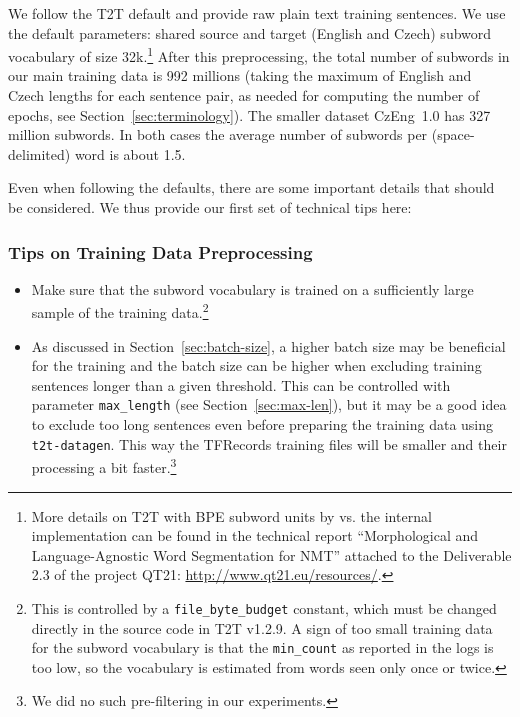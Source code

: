 \documentclass{pbmlarxiv} \pdfoutput=1
\def\Sref#1{Section~\ref{#1}}
\def\perscite#1{\citet{#1}}
\begin{document}
We follow the T2T default and provide raw plain text training sentences.
We use the default parameters: shared source and target (English and Czech) subword vocabulary
 of size 32k.\footnote{
  More details on T2T with BPE subword units by \perscite{sennrich-haddow-birch:2016:P16-12}
   vs. the internal implementation can be found in the technical report
   ``Morphological and Language-Agnostic Word Segmentation for NMT'' attached to the Deliverable 2.3
   of the project QT21: \url{http://www.qt21.eu/resources/}.
 }
After this preprocessing, the total number of subwords in our main training data is 992 millions
 (taking the maximum of English and Czech lengths for each sentence pair,
  as needed for computing the number of epochs, see \Sref{sec:terminology}).
The smaller dataset CzEng~1.0 has 327 million subwords.
In both cases the average number of subwords per (space-delimited) word is about 1.5.
%

Even when following the defaults, there are some important details that should be considered. We thus provide our first set of technical tips here:

\subsubsection*{Tips on Training Data Preprocessing}
\begin{itemize}
\item Make sure that the subword vocabulary is trained on a sufficiently large sample of the training data.\cprotect\footnote{%
  This is controlled by a \verb|file_byte_budget| constant,
   which must be changed directly in the source code in T2T v1.2.9.
  A sign of too small training data for the subword vocabulary is
   that the \verb|min_count| as reported in the logs is too low,
   so the vocabulary is estimated from words seen only once or twice.
 }
\item As discussed in Section~\ref{sec:batch-size}, a higher batch size may be beneficial for the training
  and the batch size can be higher when excluding training sentences longer than a given threshold.
 This can be controlled with parameter \verb|max_length| (see \Sref{sec:max-len}),
  but it may be a good idea to exclude too long sentences
  even before preparing the training data using \verb|t2t-datagen|.
 This way the TFRecords training files will be smaller and their processing a bit faster.\footnote{
  We did no such pre-filtering in our experiments.
 }
\end{itemize}
\end{document}
